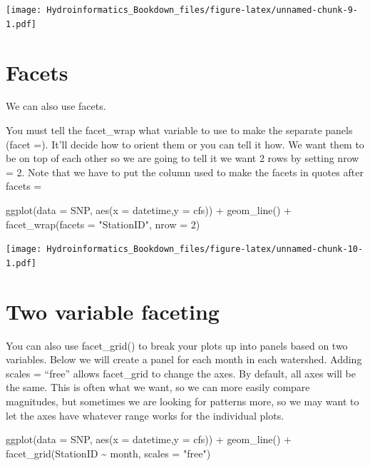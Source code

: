 \documentclass[
]{book}
\newenvironment{Shaded}{\begin{snugshade}}{\end{snugshade}}
\newcommand{\AttributeTok}[1]{\textcolor[rgb]{0.77,0.63,0.00}{#1}}
\newcommand{\DecValTok}[1]{\textcolor[rgb]{0.00,0.00,0.81}{#1}}
\newcommand{\FunctionTok}[1]{\textcolor[rgb]{0.00,0.00,0.00}{#1}}
\newcommand{\NormalTok}[1]{#1}
\newcommand{\SpecialCharTok}[1]{\textcolor[rgb]{0.00,0.00,0.00}{#1}}
\newcommand{\StringTok}[1]{\textcolor[rgb]{0.31,0.60,0.02}{#1}}
\begin{document}
\texttt{[image: Hydroinformatics\_Bookdown\_files/figure-latex/unnamed-chunk-9-1.pdf]}

\hypertarget{facets}{%
\section{Facets}\label{facets}}

We can also use facets.

You must tell the facet\_wrap what variable to use to make the separate panels (facet =). It'll decide how to orient them or you can tell it how. We want them to be on top of each other so we are going to tell it we want 2 rows by setting nrow = 2. Note that we have to put the column used to make the facets in quotes after facets =

\begin{Shaded}
\begin{Highlighting}[]
\FunctionTok{ggplot}\NormalTok{(}\AttributeTok{data =}\NormalTok{ SNP, }\FunctionTok{aes}\NormalTok{(}\AttributeTok{x =}\NormalTok{ datetime,}\AttributeTok{y =}\NormalTok{ cfs)) }\SpecialCharTok{+}
  \FunctionTok{geom\_line}\NormalTok{() }\SpecialCharTok{+}
  \FunctionTok{facet\_wrap}\NormalTok{(}\AttributeTok{facets =} \StringTok{"StationID"}\NormalTok{, }\AttributeTok{nrow =} \DecValTok{2}\NormalTok{)}
\end{Highlighting}
\end{Shaded}

\texttt{[image: Hydroinformatics\_Bookdown\_files/figure-latex/unnamed-chunk-10-1.pdf]}

\hypertarget{two-variable-faceting}{%
\section{Two variable faceting}\label{two-variable-faceting}}

You can also use facet\_grid() to break your plots up into panels based on two variables. Below we will create a panel for each month in each watershed. Adding scales = ``free'' allows facet\_grid to change the axes. By default, all axes will be the same. This is often what we want, so we can more easily compare magnitudes, but sometimes we are looking for patterns more, so we may want to let the axes have whatever range works for the individual plots.

\begin{Shaded}
\begin{Highlighting}[]
\FunctionTok{ggplot}\NormalTok{(}\AttributeTok{data =}\NormalTok{ SNP, }\FunctionTok{aes}\NormalTok{(}\AttributeTok{x =}\NormalTok{ datetime,}\AttributeTok{y =}\NormalTok{ cfs)) }\SpecialCharTok{+}
  \FunctionTok{geom\_line}\NormalTok{() }\SpecialCharTok{+}
  \FunctionTok{facet\_grid}\NormalTok{(StationID }\SpecialCharTok{\textasciitilde{}}\NormalTok{ month, }\AttributeTok{scales =} \StringTok{"free"}\NormalTok{)}
\end{Highlighting}
\end{Shaded}
\end{document}
